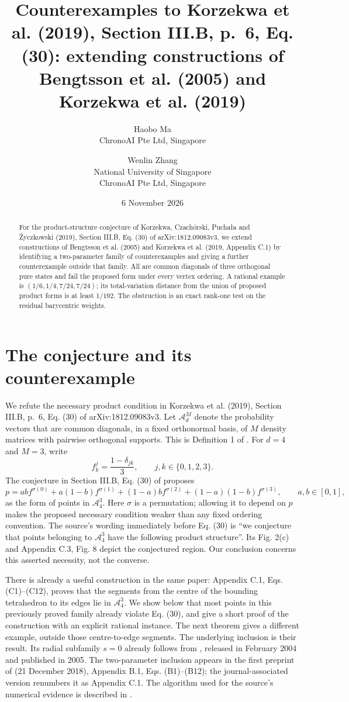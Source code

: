 \documentclass[11pt]{article}
\title{Counterexamples to Korzekwa et al. (2019),\break
Section III.B, p.~6, Eq. (30): extending constructions of\break
Bengtsson et al. (2005) and Korzekwa et al. (2019)}
\author{Haobo Ma\\\small ChronoAI Pte Ltd, Singapore
\and Wenlin Zhang\\\small National University of Singapore\\
\small ChronoAI Pte Ltd, Singapore}
\date{6 November 2026}
\newcommand{\A}{\mathcal A}
\begin{document}
\maketitle
\begin{abstract}
For the product-structure conjecture of Korzekwa, Czach\'orski,
Pucha\l a and \.Zyczkowski (2019), Section III.B, Eq. (30) of
arXiv:1812.09083v3, we extend constructions of Bengtsson et al. (2005)
and Korzekwa et al. (2019, Appendix C.1) by identifying
a two-parameter family of counterexamples and giving a further counterexample
outside that family. All are common diagonals of three orthogonal pure states
and fail the proposed form under every vertex ordering. A rational example is
$(1/6,1/4,7/24,7/24)$; its total-variation distance from the union of proposed
product forms is at least $1/192$. The obstruction is an exact rank-one test
on the residual barycentric weights.
\end{abstract}

\section{The conjecture and its counterexample}
We refute the necessary product condition in Korzekwa et al. (2019),
Section III.B, p.~6, Eq. (30) of arXiv:1812.09083v3.
Let $\A_d^M$ denote the probability vectors that are common diagonals,
in a fixed orthonormal basis, of $M$ density matrices with pairwise
orthogonal supports. This is Definition 1 of \cite{KCPZ}.
For $d=4$ and $M=3$, write
\[
 f^j_k=\frac{1-\delta_{jk}}3,\qquad j,k\in\{0,1,2,3\}.
\]
The conjecture in Section III.B, Eq. (30) of \cite{KCPZ} proposes
\begin{equation}\label{eq:ansatz}
 p=abf^{\sigma(0)}+a(1-b)f^{\sigma(1)}
 +(1-a)bf^{\sigma(2)}+(1-a)(1-b)f^{\sigma(3)},
 \qquad a,b\in[0,1],
\end{equation}
as the form of points in $\A_4^3$. Here $\sigma$ is a permutation;
allowing it to depend on $p$ makes the proposed necessary condition weaker
than any fixed ordering convention.
The source's wording immediately before Eq. (30) is
``we conjecture that points belonging to $\A_4^3$ have the following
product structure''. Its Fig. 2(c) and Appendix C.3, Fig. 8 depict the
conjectured region. Our conclusion concerns this asserted necessity, not
the converse.

There is already a useful construction in the same paper:
Appendix C.1, Eqs. (C1)--(C12), proves that the segments from the centre
of the bounding tetrahedron to its edges lie in $\A_4^3$.
We show below that most points in this previously proved family already
violate Eq. (30), and give a short proof of the construction with an explicit
rational instance. The next theorem gives a different example, outside
those centre-to-edge segments. The underlying inclusion is their result.
Its radial subfamily $s=0$ already follows from
\cite[Section 4, Eqs. (35)--(40)]{BEKTZ}, released in February 2004 and
published in 2005. The two-parameter inclusion appears in the first
preprint of \cite{KCPZ} (21 December 2018), Appendix B.1,
Eqs. (B1)--(B12); the journal-associated version renumbers it as Appendix C.1.
The algorithm used for the source's numerical evidence is
described in \cite[Appendix A]{RGZ}.
\end{document}
